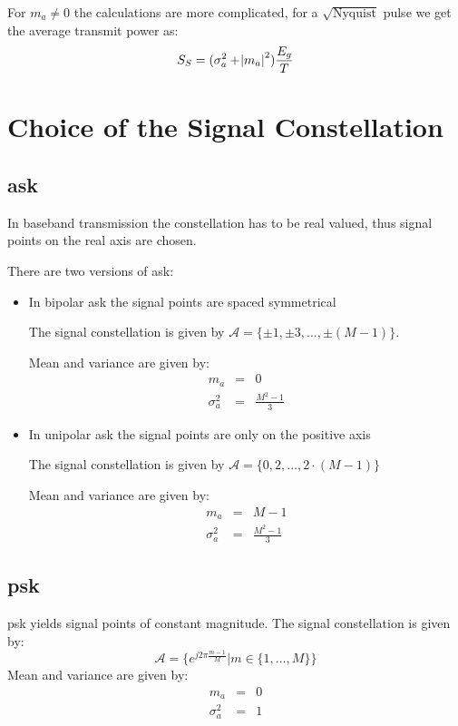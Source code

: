For $m_a \neq 0$ the calculations are more complicated, for a $\sqrt{\text{Nyquist}}$
pulse we get the average transmit power as:
\begin{equation}
    S_S = (\sigma_a^2 + \abs{m_a}^2) \frac{E_g}{T}
\end{equation}

\section{Choice of the Signal Constellation}
\subsection{\acl{ask}}
In baseband transmission the constellation has to be real valued, thus signal points
on the real axis are chosen.

There are two versions of \ac{ask}:
\begin{itemize}
    \item In bipolar \ac{ask} the signal points are spaced symmetrical
    
        The signal constellation is given by $\mathcal{A} = \{\pm 1, \pm 3, \ldots, \pm (M-1)\}$.

        Mean and variance are given by:
        \begin{eqnarray}
            m_a &=& 0 \\
            \sigma_a^2 &=& \frac{M^2 -1}{3}
        \end{eqnarray}
    \item In unipolar \ac{ask} the signal points are only on the positive axis

        The signal constellation is given by $\mathcal{A} = \{0, 2, \ldots, 2 \cdot (M-1)\}$

        Mean and variance are given by:
        \begin{eqnarray}
            m_a &=& M-1 \\
            \sigma_a^2 &=& \frac{M^2 -1}{3}
        \end{eqnarray}
\end{itemize}

\subsection{\acl{psk}}
\ac{psk} yields signal points of constant magnitude. The signal constellation is given
by:
\begin{equation}
    \mathcal{A} = \{e^{j 2 \pi \frac{m-1}{M}} | m \in \{1, \ldots, M\}\}
\end{equation}
Mean and variance are given by:
\begin{eqnarray}
    m_a &=& 0 \\
    \sigma_a^2 &=& 1
\end{eqnarray}

